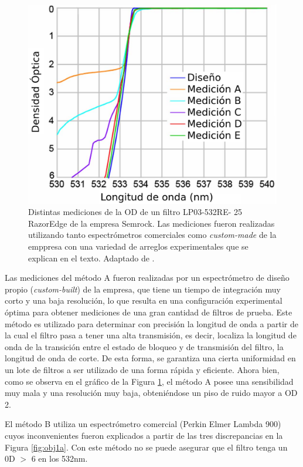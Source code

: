 \documentclass{ctuthesis}
\begin{document}
\begin{figure}[H]
	\centering
	\includegraphics[scale=0.8]{Figs/plan_de_tesis/dists_meds.png}
	\caption{Distintas mediciones de la OD de un filtro LP03-532RE-
		25 RazorEdge de la empresa Semrock. Las mediciones fueron realizadas 
		utilizando tanto espectrómetros comerciales como \textit{custom-made} 
		de la emppresa con una variedad de arreglos experimentales que se 
		explican en el texto. Adaptado de 
		\cite{Semrock}.}
	\label{fig:may_dists}
\end{figure}

Las mediciones del método A fueron realizadas por un espectrómetro de diseño 
propio (\textit{custom-built}) de la empresa,  que tiene un tiempo de 
integración muy corto y una baja resolución, lo que resulta en una 
configuración 
experimental óptima para obtener mediciones de una gran cantidad de filtros de 
prueba. Este método es utilizado para determinar con precisión la longitud de 
onda a partir de la cual el filtro pasa a tener una alta transmisión, es decir, 
localiza la longitud de onda de la transición entre el estado de bloqueo y de 
transmisión del filtro, la longitud de onda de corte. De esta forma, se 
garantiza una cierta uniformidad en un lote de filtros a ser utilizado de una 
forma rápida y eficiente. Ahora bien, como se observa en el gráfico de la 
Figura \ref{fig:may_dists}, el método A posee una sensibilidad muy mala y una 
resolución muy baja, obteniéndose un piso de ruido mayor a OD 2.

El método B utiliza un espectrómetro comercial (Perkin Elmer
Lambda 900) cuyos inconvenientes fueron explicados a partir de las tres 
discrepancias en la Figura \ref{fig:obj1a}. Con este método no se puede 
asegurar que el filtro tenga un 0D $>$ 6 en los 532nm.
\end{document}
